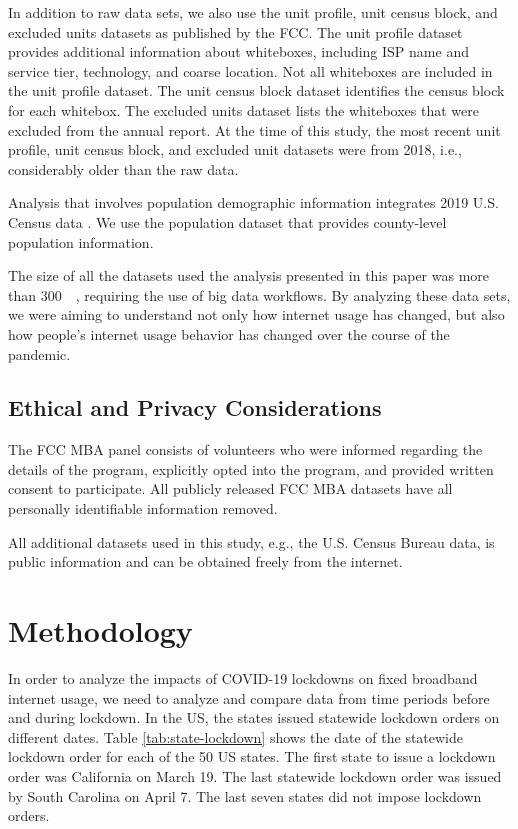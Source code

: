 \documentclass[conference,10pt]{IEEEtran}
\begin{document}
In addition to raw data sets, we also use the unit profile, unit census block, and excluded units datasets as published by the FCC. The unit profile dataset provides additional information about whiteboxes, including ISP name and service tier, technology, and coarse location. Not all whiteboxes are included in the unit profile dataset. The unit census block dataset identifies the census block for each whitebox. The excluded units dataset lists the whiteboxes that were excluded from the annual report. At the time of this study, the most recent unit profile, unit census block, and excluded unit datasets were from 2018, i.e., considerably older than the raw data.

Analysis that involves population demographic information integrates 2019 U.S. Census data \cite{census}. We use the population dataset that provides county-level population information.

The size of all the datasets used the analysis presented in this paper was more than \SI{300}{\giga\byte}, requiring the use of big data workflows. By analyzing these data sets, we were aiming to understand not only how internet usage has changed, but also how people's internet usage behavior has changed over the course of the pandemic.

\subsection{Ethical and Privacy Considerations}
\label{sec:ethical-and-privacy-considerations}

The FCC MBA panel consists of volunteers who were informed regarding the details of the program, explicitly opted into the program, and provided written consent to participate. All publicly released FCC MBA datasets have all personally identifiable information removed.

All additional datasets used in this study, e.g., the U.S. Census Bureau data, is public information and can be obtained freely from the internet.

\section{Methodology}
\label{sec:methodology}

In order to analyze the impacts of COVID-19 lockdowns on fixed broadband internet usage, we need to analyze and compare data from time periods before and during lockdown. In the US, the states issued statewide lockdown orders on different dates. Table \ref{tab:state-lockdown} shows the date of the statewide lockdown order for each of the 50 US states. The first state to issue a lockdown order was California on March 19. The last statewide lockdown order was issued by South Carolina on April 7. The last seven states did not impose lockdown orders.
\end{document}
